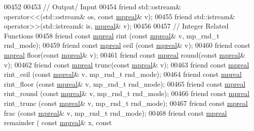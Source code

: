 \begin{DoxyCode}
00452 
00453     \textcolor{comment}{// Output/ Input}
00454     \textcolor{keyword}{friend} std::ostream& operator<<(std::ostream& os, \textcolor{keyword}{const} \hyperlink{classmpfr_1_1mpreal}{mpreal}& v);
00455     \textcolor{keyword}{friend} std::istream& operator>>(std::istream& is, \hyperlink{classmpfr_1_1mpreal}{mpreal}& v);
00456 
00457     \textcolor{comment}{// Integer Related Functions}
00458     \textcolor{keyword}{friend} \textcolor{keyword}{const} \hyperlink{classmpfr_1_1mpreal}{mpreal} rint (\textcolor{keyword}{const} \hyperlink{classmpfr_1_1mpreal}{mpreal}& v, mp\_rnd\_t rnd\_mode);
00459     \textcolor{keyword}{friend} \textcolor{keyword}{const} \hyperlink{classmpfr_1_1mpreal}{mpreal} ceil (\textcolor{keyword}{const} \hyperlink{classmpfr_1_1mpreal}{mpreal}& v);
00460     \textcolor{keyword}{friend} \textcolor{keyword}{const} \hyperlink{classmpfr_1_1mpreal}{mpreal} floor(\textcolor{keyword}{const} \hyperlink{classmpfr_1_1mpreal}{mpreal}& v);
00461     \textcolor{keyword}{friend} \textcolor{keyword}{const} \hyperlink{classmpfr_1_1mpreal}{mpreal} round(\textcolor{keyword}{const} \hyperlink{classmpfr_1_1mpreal}{mpreal}& v);
00462     \textcolor{keyword}{friend} \textcolor{keyword}{const} \hyperlink{classmpfr_1_1mpreal}{mpreal} trunc(\textcolor{keyword}{const} \hyperlink{classmpfr_1_1mpreal}{mpreal}& v);
00463     \textcolor{keyword}{friend} \textcolor{keyword}{const} \hyperlink{classmpfr_1_1mpreal}{mpreal} rint\_ceil   (\textcolor{keyword}{const} \hyperlink{classmpfr_1_1mpreal}{mpreal}& v, mp\_rnd\_t rnd\_mode);
00464     \textcolor{keyword}{friend} \textcolor{keyword}{const} \hyperlink{classmpfr_1_1mpreal}{mpreal} rint\_floor  (\textcolor{keyword}{const} \hyperlink{classmpfr_1_1mpreal}{mpreal}& v, mp\_rnd\_t rnd\_mode);
00465     \textcolor{keyword}{friend} \textcolor{keyword}{const} \hyperlink{classmpfr_1_1mpreal}{mpreal} rint\_round  (\textcolor{keyword}{const} \hyperlink{classmpfr_1_1mpreal}{mpreal}& v, mp\_rnd\_t rnd\_mode);
00466     \textcolor{keyword}{friend} \textcolor{keyword}{const} \hyperlink{classmpfr_1_1mpreal}{mpreal} rint\_trunc  (\textcolor{keyword}{const} \hyperlink{classmpfr_1_1mpreal}{mpreal}& v, mp\_rnd\_t rnd\_mode);
00467     \textcolor{keyword}{friend} \textcolor{keyword}{const} \hyperlink{classmpfr_1_1mpreal}{mpreal} frac        (\textcolor{keyword}{const} \hyperlink{classmpfr_1_1mpreal}{mpreal}& v, mp\_rnd\_t rnd\_mode);
00468     \textcolor{keyword}{friend} \textcolor{keyword}{const} \hyperlink{classmpfr_1_1mpreal}{mpreal} remainder   (         \textcolor{keyword}{const} \hyperlink{classmpfr_1_1mpreal}{mpreal}& x, \textcolor{keyword}{const} 

\end{DoxyCode}
